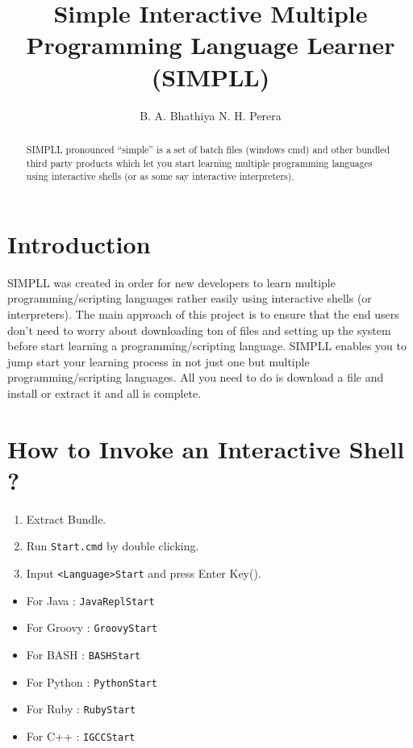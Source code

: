 \documentclass[a4paper]{article}
\title{Simple Interactive Multiple Programming Language Learner (SIMPLL)}
\author{B. A. Bhathiya N. H. Perera}
\begin{document}
\maketitle

\begin{abstract}
SIMPLL pronounced “simple” is a set of batch files (windows cmd) and other bundled third party products which let you start learning multiple programming languages using interactive shells (or as some say interactive interpreters).
\end{abstract}

\section{Introduction}

SIMPLL was created in order for new developers to learn multiple programming/scripting languages rather easily using interactive shells (or interpreters). The main approach of this project is to ensure that the end users don’t need to worry about downloading ton of files and setting up the system before start learning a programming/scripting language. SIMPLL enables you to jump start your learning process in not just one but multiple programming/scripting languages. All you need to do is download a file and install or extract it and all is complete.

\section{How to Invoke an Interactive Shell ?}

\begin{enumerate}
\item Extract Bundle.
\item Run \texttt{Start.cmd} by double clicking.
\item Input \texttt{\textless Language\textgreater Start} and press Enter Key(\Return).
\end{enumerate}

\begin{itemize}
\setlength{\itemindent}{+.5in}
\item For Java : \texttt{JavaReplStart}
\item For Groovy : \texttt{GroovyStart}
\item For BASH : \texttt{BASHStart}
\item For Python : \texttt{PythonStart}
\item For Ruby : \texttt{RubyStart}
\item For C++ : \texttt{IGCCStart}
\end{itemize}
\end{document}
